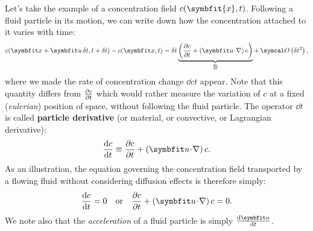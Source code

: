 Let's take the example of a concentration field $c(\symbfit{x},t)$. Following a fluid particle in its motion, we can write down how the concentration attached to it varies with time:
\begin{equation}
c(\bx+\bu\, \delt,t+\delt) - c(\bx,t) = \delt\underbrace{\lp\pd{c}{t} + \lp \bu \!\cdot\! \nabla \rp c\rp}_{\dd{c}{t}} + \, \symcal O\lp\delt^2\rp,
\end{equation}
where we made the rate of concentration change $\dd{c}{t}$ appear. Note that this quantity differs from $\frac{\partial c}{\partial t}$ which would rather measure the variation of  $c$ at a fixed (\textit{eulerian}) position of space, without following the fluid particle. The operator $\dd{}{t}$ is called \textbf{particle derivative} (or material, or convective, or Lagrangian derivative):
\begin{equation}
\dd{c}{t} \equiv \pd{c}{t} + \lp \bu \!\cdot\! \nabla \rp c.
\end{equation}
As an illustration, the equation governing the concentration field transported by a flowing fluid without considering diffusion effects is therefore simply:
\begin{equation}
\dd{c}{t} = 0 \quad \text{or}\quad\pd{c}{t} + \lp \bu \!\cdot\! \nabla \rp c = 0.
\end{equation}
We note also that the \textit{acceleration} of a fluid particle is simply $\dd{\bu}{t}$.

